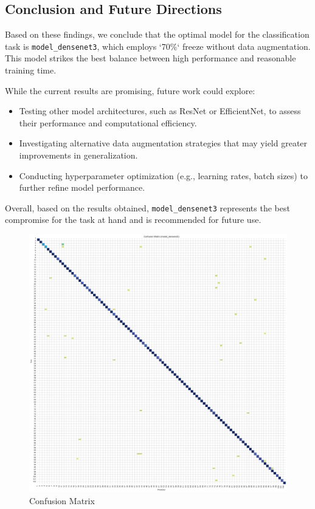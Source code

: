 \subsection{Conclusion and Future Directions}

Based on these findings, we conclude that the optimal model for the classification task is \texttt{model\_densenet3}, which employs `70\%` freeze without data augmentation. This model strikes the best balance between high performance and reasonable training time.

While the current results are promising, future work could explore:
\begin{itemize}
    \item Testing other model architectures, such as ResNet or EfficientNet, to assess their performance and computational efficiency.
    \item Investigating alternative data augmentation strategies that may yield greater improvements in generalization.
    \item Conducting hyperparameter optimization (e.g., learning rates, batch sizes) to further refine model performance.
\end{itemize}

Overall, based on the results obtained, \texttt{model\_densenet3} represents the best compromise for the task at hand and is recommended for future use.

\begin{figure}[h!]
    \centering
    \includegraphics[width=\linewidth]{Images/Confusion Matrix}
    \caption{Confusion Matrix}
\end{figure}

